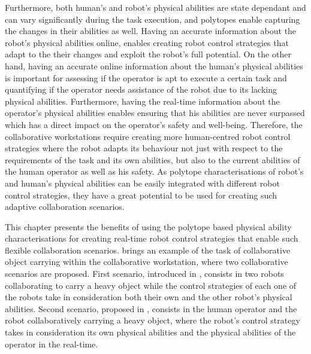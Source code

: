 Furthermore, both human's and robot's physical abilities are state dependant and can vary significantly during the task execution, and polytopes enable capturing the changes in their abilities as well. Having an accurate information about the robot's physical abilities online, enables creating robot control strategies that adapt to the their changes and exploit the robot's full potential. On the other hand, having an accurate online information about the human's physical abilities is important for assessing if the operator is apt to execute a certain task and quantifying if the operator needs assistance of the robot due to its lacking physical abilities. Furthermore, having the real-time information about the operator's physical abilities enables ensuring that his abilities are never surpassed which has a direct impact on the operator's safety and well-being. Therefore, the collaborative workstations require creating more human-centred robot control strategies where the robot adapts its behaviour not just with respect to the requirements of the task and its own abilities, but also to the current abilities of the human operator as well as his safety. As polytope characterisations of robot's and human's physical abilities can be easily integrated with different robot control strategies, they have a great potential to be used for creating such adaptive collaboration scenarios.


This chapter presents the benefits of using the polytope based physical ability characterisations for creating real-time robot control strategies that enable such flexible collaboration scenarios.  brings an example of the task of collaborative object carrying within the collaborative workstation, where two collaborative scenarios are proposed. First scenario, introduced in , consists in two robots collaborating to carry a heavy object while the control strategies of each one of the robots take in consideration both their own and the other robot's physical abilities. Second scenario, proposed in , consists in the human operator and the robot collaboratively carrying a heavy object, where the robot's control strategy takes in consideration its own physical abilities and the physical abilities of the operator in the real-time. 


